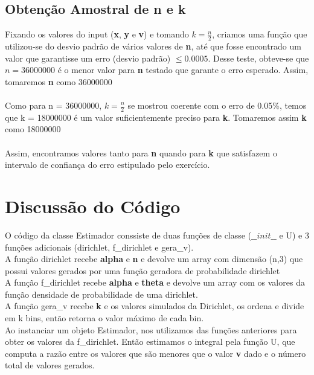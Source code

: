 \documentclass{article}
\begin{document}
\subsection{Obtenção Amostral de n e k}
    Fixando os valores do input (\textbf{x}, \textbf{y} e \textbf{v}) e tomando $k = \frac{n}{2}$, criamos uma função que utilizou-se do desvio padrão de vários valores de \textbf{n}, até que fosse encontrado um valor que garantisse um erro (desvio padrão) $\leq 0.0005$. Desse teste, obteve-se que $n = 36000000 $ é o menor valor para \textbf{n} testado que garante o erro esperado. Assim, tomaremos \textbf{n} como 36000000\\
    \\
    Como para n = 36000000, $k = \frac{n}{2}$ se mostrou coerente com o erro de 0.05\%, temos que k = 18000000 é um valor suficientemente preciso para \textbf{k}. Tomaremos assim \textbf{k} como 18000000\\
    \\
    Assim, encontramos valores tanto para \textbf{n} quando para \textbf{k} que satisfazem o intervalo de confiança do erro estipulado pelo exercício.

\section{Discussão do Código}

    O código da classe Estimador conssiste de duas funções de classe ($\_\_init\_\_$ e U) e 3 funções adicionais (dirichlet, f\_dirichlet e gera\_v).\\
    
    A função dirichlet recebe \textbf{alpha} e \textbf{n} e devolve um array com dimensão (n,3) que possui valores gerados por uma função geradora de probabilidade dirichlet\\
    
    A função f\_dirichlet recebe \textbf{alpha} e \textbf{theta} e devolve um array com os valores da função densidade de probabilidade de uma dirichlet.\\
    
    A função gera\_v recebe \textbf{k} e os valores simulados da Dirichlet, os ordena e divide em k bins, então retorna o valor máximo de cada bin.\\
    
    Ao instanciar um objeto Estimador, nos utilizamos das funções anteriores para obter os valores da f\_dirichlet. Então estimamos o integral pela função U, que computa a razão entre os valores que são menores que o valor \textbf{v} dado e o número total de valores gerados.
\end{document}
